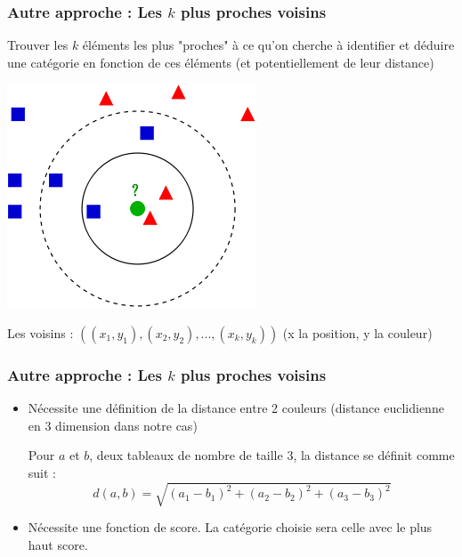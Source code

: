 \documentclass[french]{beamer}
\begin{document}
\begin{frame}
\frametitle{Autre approche : Les $k$ plus proches voisins}
Trouver les $k$ éléments les plus "proches" à ce qu'on cherche à identifier et déduire une catégorie en fonction de ces éléments (et potentiellement de leur distance)
\begin{center}
\includegraphics[scale=0.4]{KnnClassification.png}
\end{center}

Les voisins : $((x_1,y_1),(x_2,y_2),...,(x_k,y_k))$ (x la position, y la couleur)
\end{frame}

\begin{frame}
\frametitle{Autre approche : Les $k$ plus proches voisins}

\begin{itemize}

\item{Nécessite une définition de la distance entre 2 couleurs (distance euclidienne en 3 dimension dans notre cas)}

Pour $a$ et $b$, deux tableaux de nombre de taille 3, la distance se définit comme suit :
$$ d(a,b) = \sqrt{(a_1-b_1)^2+(a_2-b_2)^2+(a_3-b_3)^2}$$

\item{Nécessite une fonction de score. La catégorie choisie sera celle avec le plus haut score.}
\end{itemize}

\end{frame}
\end{document}
